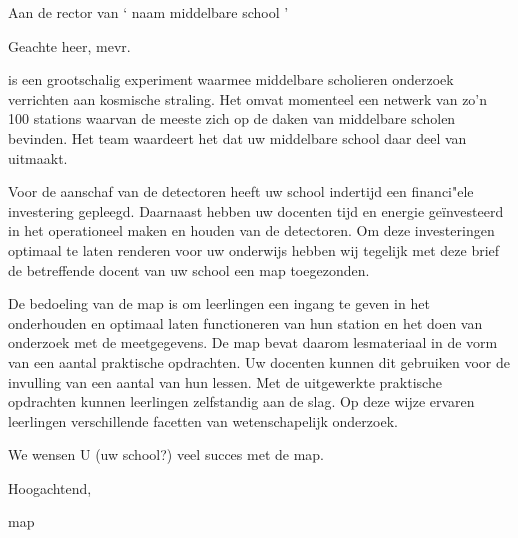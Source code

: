 




\date{}

\maketitle
 
Aan de rector van ` naam middelbare school ' 

Geachte heer, mevr. 

\hisparc is een grootschalig experiment waarmee middelbare scholieren
onderzoek verrichten aan kosmische straling. Het omvat momenteel een
netwerk van zo'n 100 stations waarvan de meeste zich op de daken van
middelbare scholen bevinden. Het \hisparc team waardeert het dat uw
middelbare school daar deel van uitmaakt.  

Voor de aanschaf van de detectoren heeft uw school indertijd een financi"ele investering gepleegd. Daarnaast hebben uw docenten tijd en energie ge\"investeerd in het operationeel maken en houden van de detectoren. Om deze investeringen optimaal te laten renderen voor uw onderwijs hebben wij tegelijk met deze brief de betreffende docent van uw school een \hisparc map  toegezonden.

De bedoeling van de \hisparc map is om leerlingen een ingang te geven in het onderhouden en optimaal laten functioneren van hun \hisparc station en het doen van onderzoek met de meetgegevens. De \hisparc map bevat daarom lesmateriaal in de vorm van een aantal praktische opdrachten. Uw docenten kunnen dit gebruiken voor de invulling van een aantal van hun lessen. Met de uitgewerkte praktische opdrachten kunnen leerlingen zelfstandig aan de slag. Op deze wijze ervaren leerlingen verschillende facetten van wetenschapelijk onderzoek. 

We wensen U (uw school?) veel succes met de \hisparc map.
 
Hoogachtend,

\hisparc map
 
 

